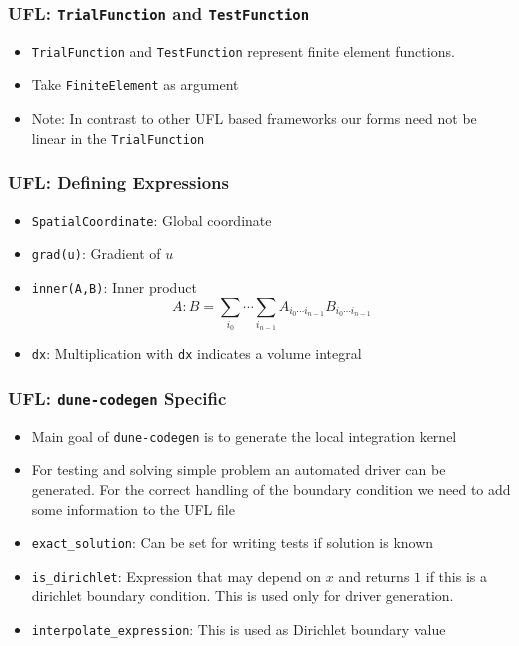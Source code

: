 \documentclass[ignorenonframetext,11pt]{beamer}
\theoremstyle{definition}
\begin{document}
\begin{frame}[fragile]
  \frametitle{UFL: \lstinline{TrialFunction} and \lstinline{TestFunction}}

  
  \vfill
  \begin{itemize}
  \item \lstinline{TrialFunction} and \lstinline{TestFunction} represent finite element functions.
  \item Take \lstinline{FiniteElement} as argument
  \item Note: In contrast to other UFL based frameworks our forms need not be
    linear in the \lstinline{TrialFunction}
  \end{itemize}
\end{frame}

\begin{frame}
  \frametitle{UFL: Defining Expressions}
  
  \vfill
  \begin{itemize}
  \item \lstinline{SpatialCoordinate}: Global coordinate
  \item \lstinline{grad(u)}: Gradient of $u$
  \item \lstinline{inner(A,B)}: Inner product
    \begin{equation*}
      A:B = \sum_{i_0}\cdots\sum_{i_{n-1}}A_{i_0\cdots i_{n-1}}B_{i_0\cdots i_{n-1}}
    \end{equation*}
  \item \lstinline{dx}: Multiplication with \lstinline{dx} indicates a volume
    integral
  \end{itemize}
\end{frame}

\begin{frame}
  \frametitle{UFL: \lstinline{dune-codegen} Specific}
  
  \vfill
  \begin{itemize}
  \item Main goal of \lstinline{dune-codegen} is to generate the local integration kernel
  \item For testing and solving simple problem an automated driver can be
    generated. For the correct handling of the boundary condition we need to
    add some information to the UFL file
  \item \lstinline{exact_solution}: Can be set for writing tests if solution is known
  \item \lstinline{is_dirichlet}: Expression that may depend on $x$ and returns
    $1$ if this is a dirichlet boundary condition. This is used only for driver
    generation.
  \item \lstinline{interpolate_expression}: This is used as Dirichlet boundary value
  \end{itemize}
\end{frame}
\end{document}
